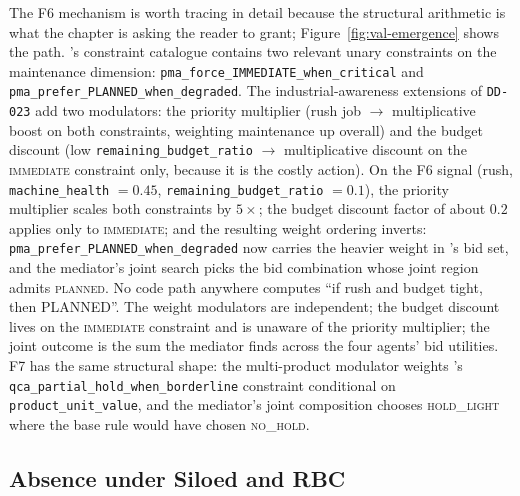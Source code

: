 The F6 mechanism is worth tracing in detail because the structural
arithmetic is what the chapter is asking the reader to grant;
Figure~\ref{fig:val-emergence} shows the path.
\PMA{}'s
constraint catalogue contains two relevant unary constraints on the
maintenance dimension: \texttt{pma\_force\_IMMEDIATE\_when\_critical}
and \texttt{pma\_prefer\_PLANNED\_when\_degraded}. The
industrial-awareness extensions of \texttt{DD-023} add two
modulators: the priority multiplier (rush job $\to$ multiplicative
boost on both constraints, weighting maintenance up overall) and the
budget discount (low \texttt{remaining\_budget\_ratio} $\to$
multiplicative discount on the \textsc{immediate} constraint only,
because it is the costly action). On the F6 signal (rush,
\texttt{machine\_health} $= 0.45$, \texttt{remaining\_budget\_ratio} $=
0.1$), the priority multiplier scales both constraints by $5\times$;
the budget discount factor of about $0.2$ applies only to
\textsc{immediate}; and the resulting weight ordering inverts:
\texttt{pma\_prefer\_PLANNED\_when\_degraded} now carries the heavier
weight in \PMA{}'s bid set, and the mediator's joint search picks the
bid combination whose joint region admits \textsc{planned}. No code
path anywhere computes ``if rush and budget tight, then PLANNED''.
The weight modulators are independent; the budget discount lives on
the \textsc{immediate} constraint and is unaware of the priority
multiplier; the joint outcome is the sum the mediator finds across
the four agents' bid utilities. F7 has the same structural shape:
the multi-product modulator weights \QCA{}'s
\texttt{qca\_partial\_hold\_when\_borderline} constraint conditional
on \texttt{product\_unit\_value}, and the mediator's joint composition
chooses \textsc{hold\_light} where the base rule would have chosen
\textsc{no\_hold}.


\subsection*{Absence under Siloed and RBC}

